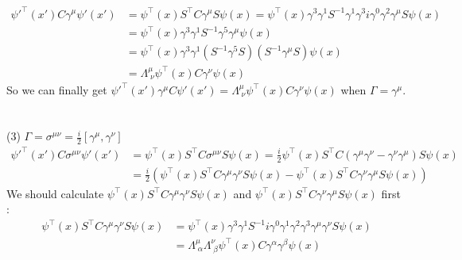 \documentclass[12pt]{article}
\begin{document}
\begin{spacing}{1.5}
\begin{equation}
\begin{aligned}
\psi'^{\top}(x')C\gamma^{\mu}\psi'(x') &= \psi^{\top}(x)S^{\top}C\gamma^{\mu}S\psi(x) =\psi^{\top}(x)\gamma^{3}\gamma^{1}S^{-1}\gamma^{1}\gamma^{3}i\gamma^{0}\gamma^{2}\gamma^{\mu}S\psi(x)\\
&= \psi^{\top}(x)\gamma^{3}\gamma^{1}S^{-1}\gamma^{5}\gamma^{\mu}\psi(x) \\
&= \psi^{\top}(x)\gamma^{3}\gamma^{1}(S^{-1}\gamma^{5}S)(S^{-1}\gamma^{\mu}S)\psi(x) \\
&= \Lambda^{\mu}_{\;\nu}\psi^{\top}(x)C\gamma^{\nu}\psi(x)
\end{aligned}	\tag{1.2.7}
\end{equation}
So we can finally get $\psi'^{\top}(x')\gamma^{\mu}C\psi'(x')=\Lambda^{\mu}_{\;\nu}\psi^{\top}(x)C\gamma^{\nu}\psi(x)$ when $\Gamma=\gamma^{\mu}$.\\
~\\
~\\
(3) $\displaystyle \Gamma=\sigma^{\mu\nu}=\frac{i}{2}[\gamma^{\mu},\gamma^{\nu}]$ \\ 
\begin{equation}
\begin{aligned}
\displaystyle \psi'^{\top}(x')C\sigma^{\mu\nu}\psi'(x') &= \psi^{\top}(x)S^{\top}C\sigma^{\mu\nu}S\psi(x)=\frac{i}{2}\psi^{\top}(x)S^{\top}C(\gamma^{\mu}\gamma^{\nu}-\gamma^{\nu}\gamma^{\mu})S\psi(x) \\
&= \frac{i}{2}(\psi^{\top}(x)S^{\top}C\gamma^{\mu}\gamma^{\nu}S\psi(x)-\psi^{\top}(x)S^{\top}C\gamma^{\nu}\gamma^{\mu}S\psi(x))
\end{aligned}	\tag{1.3.1}
\end{equation}
We should calculate $\psi^{\top}(x)S^{\top}C\gamma^{\mu}\gamma^{\nu}S\psi(x)$ and $\psi^{\top}(x)S^{\top}C\gamma^{\nu}\gamma^{\mu}S\psi(x)$ first :
\begin{equation}
\begin{aligned}
\displaystyle \psi^{\top}(x)S^{\top}C\gamma^{\mu}\gamma^{\nu}S\psi(x) &= \psi^{\top}(x)\gamma^{3}\gamma^{1}S^{-1}i\gamma^{0}\gamma^{1}\gamma^{2}\gamma^{3}\gamma^{\mu}\gamma^{\nu}S\psi(x) \\
&=\Lambda^{\mu}_{\;\alpha}\Lambda^{\nu}_{\;\beta}\psi^{\top}(x)C\gamma^{\alpha}\gamma^{\beta}\psi(x)
\end{aligned}	\tag{1.3.2}	
\end{equation}
\begin{equation}
\begin{aligned}

\end{aligned}
\end{equation}
\end{spacing}
\end{document}
